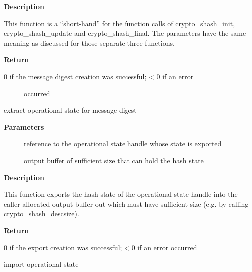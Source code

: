 \documentclass[a4paper,8pt,english]{sphinxmanual}
\begin{document}
\textbf{Description}

This function is a ``short-hand'' for the function calls of crypto\_shash\_init,
crypto\_shash\_update and crypto\_shash\_final. The parameters have the same
meaning as discussed for those separate three functions.

\textbf{Return}
\begin{description}
\item[{0 if the message digest creation was successful; \textless{} 0 if an error}] \leavevmode
occurred

\end{description}

\begin{fulllineitems}
\label{crypto/api-digest:c.crypto_shash_export}
extract operational state for message digest

\end{fulllineitems}


\textbf{Parameters}
\begin{description}
\item[{}] \leavevmode
reference to the operational state handle whose state is exported

\item[{}] \leavevmode
output buffer of sufficient size that can hold the hash state

\end{description}

\textbf{Description}

This function exports the hash state of the operational state handle into the
caller-allocated output buffer out which must have sufficient size (e.g. by
calling crypto\_shash\_descsize).

\textbf{Return}

0 if the export creation was successful; \textless{} 0 if an error occurred

\begin{fulllineitems}
\label{crypto/api-digest:c.crypto_shash_import}
import operational state

\end{fulllineitems}
\end{document}

